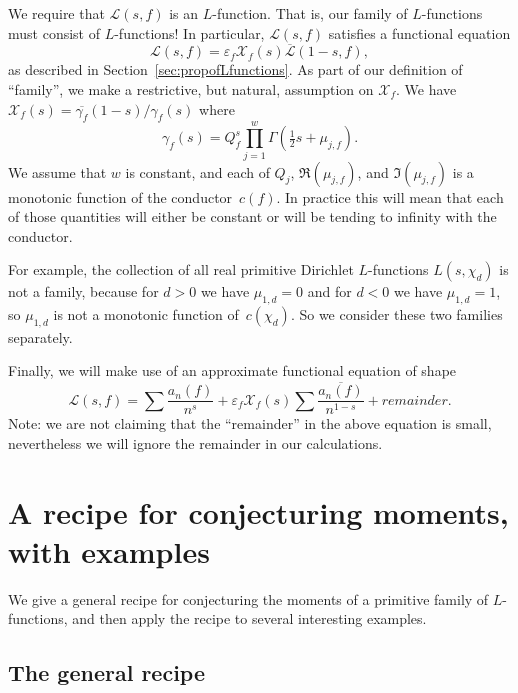 \documentclass[12pt,letterpaper]{amsart}
\theoremstyle{plain}
\theoremstyle{definition}
\theoremstyle{remark}
\numberwithin{equation}{subsection}
\numberwithin{theorem}{subsection}
\numberwithin{table}{subsection}
\begin{document}
We require that $\mathcal{L}(s,f)$ is an $L$-function.  That is, our family
of $L$-functions must consist of $L$-functions!  In particular, $\mathcal{L}(s,f)$
 satisfies a functional equation
\begin{equation}\mathcal{L}(s,f)=
\varepsilon_f \mathcal{X}_f(s) \overline{\mathcal{L}}(1-s,f),
\label{eqn:genfe}
\end{equation}
as described in Section~\ref{sec:propofLfunctions}.
As part of our definition of ``family'', 
we make a restrictive, but natural, assumption on $\mathcal{X}_f$.
We have $\mathcal{X}_f(s)= \overline{\gamma_f}(1-s)/\gamma_f(s)$ where
\begin{equation}
\gamma_f(s)=Q_f^s\prod_{j=1}^w \Gamma(\tfrac12 s+\mu_{j,f}) .
\end{equation}
We assume that $w$ is constant, and each of $Q_j$, $\Re(\mu_{j,f})$,
and $\Im(\mu_{j,f})$ is a monotonic function of the conductor~$c(f)$.
In practice this will mean that each of those quantities will
either be constant or will be tending to infinity with the conductor.

For example, the collection of all real primitive Dirichlet $L$-functions 
$L(s,\chi_d)$
is not a family, because for $d>0$ we have $\mu_{1,d}=0$ and 
for $d<0$ we have  $\mu_{1,d}=1$, so $\mu_{1,d}$ is not
a monotonic function of~$c(\chi_d)$.
So we consider these two families separately.

Finally, we will make use of an approximate functional equation
of shape
\begin{equation}\label{eqn:generalappfe}
\mathcal{L}(s,f)= \sum \frac{a_n(f)}{n^s}+
\varepsilon_f \mathcal{X}_f(s) \sum
\frac{\overline{a_n(f)}}{n^{1-s}} + remainder.
\end{equation}
Note: we are not claiming that the ``remainder'' in the above equation
is small, nevertheless we will ignore the remainder in our calculations.

\section{A recipe for conjecturing moments, with examples}\label{sec:recipe}

We give a general recipe for conjecturing the moments of a primitive family
of $L$-functions, and then apply the recipe to several interesting examples.

\subsection{ The general recipe
}\label{sec:generalrecipe}
\end{document}
